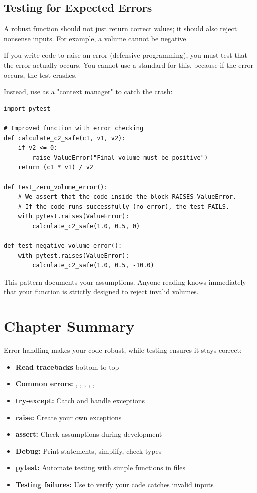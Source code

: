 \subsection{Testing for Expected Errors}

A robust function should not just return correct values; it should also reject nonsense inputs. For example, a volume cannot be negative.

If you write code to raise an error (defensive programming), you must test that the error actually occurs. You cannot use a standard  for this, because if the error occurs, the test crashes.

Instead, use  as a "context manager" to catch the crash:

\begin{lstlisting}
import pytest

# Improved function with error checking
def calculate_c2_safe(c1, v1, v2):
    if v2 <= 0:
        raise ValueError("Final volume must be positive")
    return (c1 * v1) / v2

def test_zero_volume_error():
    # We assert that the code inside the block RAISES ValueError.
    # If the code runs successfully (no error), the test FAILS.
    with pytest.raises(ValueError):
        calculate_c2_safe(1.0, 0.5, 0)

def test_negative_volume_error():
    with pytest.raises(ValueError):
        calculate_c2_safe(1.0, 0.5, -10.0)
\end{lstlisting}

This pattern documents your assumptions. Anyone reading  knows immediately that your function is strictly designed to reject invalid volumes.


\section{Chapter Summary}
\label{sec:errors-summary}

Error handling makes your code robust, while testing ensures it stays correct:

\begin{itemize}
    \item \textbf{Read tracebacks} bottom to top
    \item \textbf{Common errors:} , , , , , 
    \item \textbf{try-except:} Catch and handle exceptions
    \item \textbf{raise:} Create your own exceptions
    \item \textbf{assert:} Check assumptions during development
    \item \textbf{Debug:} Print statements, simplify, check types
    \item \textbf{pytest:} Automate testing with simple functions in  files
    \item \textbf{Testing failures:} Use  to verify your code catches invalid inputs
\end{itemize}


